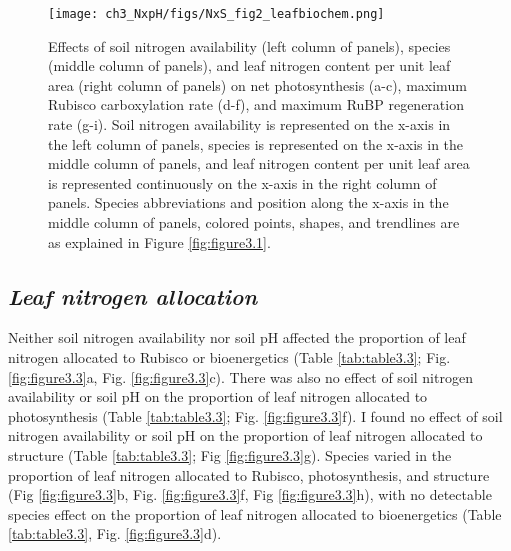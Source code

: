 \newpage
\begin{figure}
    \texttt{[image: ch3\_NxpH/figs/NxS\_fig2\_leafbiochem.png]}
    \centering
    \caption[Effects of soil nitrogen availability, species, and leaf nitrogen content on net photosynthesis, maximum Rubisco carboxylation rate, and maximum RuBP regeneration rate]{Effects of soil nitrogen availability (left column of panels), species (middle column of panels), and leaf nitrogen content per unit leaf area (right column of panels) on net photosynthesis (a-c), maximum Rubisco carboxylation rate (d-f), and maximum RuBP regeneration rate (g-i). Soil nitrogen availability is represented on the x-axis in the left column of panels, species is represented on the x-axis in the middle column of panels, and leaf nitrogen content per unit leaf area is represented continuously on the x-axis in the right column of panels. Species abbreviations and position along the x-axis in the middle column of panels, colored points, shapes, and trendlines are as explained in Figure \ref{fig:figure3.1}.}
    \label{fig:figure3.2}
\end{figure}
\clearpage

\newpage
\subsection{\textit{Leaf nitrogen allocation}}
\noindent Neither soil nitrogen availability nor soil pH affected the proportion of leaf nitrogen allocated to Rubisco or bioenergetics (Table \ref{tab:table3.3}; Fig. \ref{fig:figure3.3}a, Fig. \ref{fig:figure3.3}c). There was also no effect of soil nitrogen availability or soil pH on the proportion of leaf nitrogen allocated to photosynthesis (Table \ref{tab:table3.3}; Fig. \ref{fig:figure3.3}f). I found no effect of soil nitrogen availability or soil pH on the proportion of leaf nitrogen allocated to structure (Table \ref{tab:table3.3}; Fig \ref{fig:figure3.3}g). Species varied in the proportion of leaf nitrogen allocated to Rubisco, photosynthesis, and structure (Fig \ref{fig:figure3.3}b, Fig. \ref{fig:figure3.3}f, Fig \ref{fig:figure3.3}h), with no detectable species effect on the proportion of leaf nitrogen allocated to bioenergetics (Table \ref{tab:table3.3}, Fig. \ref{fig:figure3.3}d).
\clearpage

